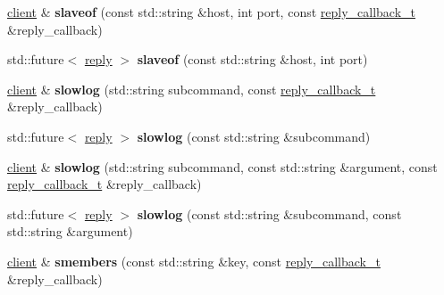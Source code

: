 \begin{DoxyCompactItemize}
\mbox{\hyperlink{classcpp__redis_1_1client}{client}} \& {\bfseries slaveof} (const std\+::string \&host, int port, const \mbox{\hyperlink{classcpp__redis_1_1client_af7a65eb21aa25230bfbb0b0203c4fc04}{reply\+\_\+callback\+\_\+t}} \&reply\+\_\+callback)
\item 
\mbox{\label{classcpp__redis_1_1client_a1731c94f72a209ffcba25767b8cab386}} 
std\+::future$<$ \mbox{\hyperlink{classcpp__redis_1_1reply}{reply}} $>$ {\bfseries slaveof} (const std\+::string \&host, int port)
\item 
\mbox{\label{classcpp__redis_1_1client_a76a67c81c82d7acb761119a9652e2e6e}} 
\mbox{\hyperlink{classcpp__redis_1_1client}{client}} \& {\bfseries slowlog} (std\+::string subcommand, const \mbox{\hyperlink{classcpp__redis_1_1client_af7a65eb21aa25230bfbb0b0203c4fc04}{reply\+\_\+callback\+\_\+t}} \&reply\+\_\+callback)
\item 
\mbox{\label{classcpp__redis_1_1client_a73f52f578ac8f266eb6e2b1f2a9cfdff}} 
std\+::future$<$ \mbox{\hyperlink{classcpp__redis_1_1reply}{reply}} $>$ {\bfseries slowlog} (const std\+::string \&subcommand)
\item 
\mbox{\label{classcpp__redis_1_1client_ab798e699b50114c4832f285fe95b6955}} 
\mbox{\hyperlink{classcpp__redis_1_1client}{client}} \& {\bfseries slowlog} (std\+::string subcommand, const std\+::string \&argument, const \mbox{\hyperlink{classcpp__redis_1_1client_af7a65eb21aa25230bfbb0b0203c4fc04}{reply\+\_\+callback\+\_\+t}} \&reply\+\_\+callback)
\item 
\mbox{\label{classcpp__redis_1_1client_a4b3b0c8b11cc1e7f0bdb827eba6f7dc3}} 
std\+::future$<$ \mbox{\hyperlink{classcpp__redis_1_1reply}{reply}} $>$ {\bfseries slowlog} (const std\+::string \&subcommand, const std\+::string \&argument)
\item 
\mbox{\label{classcpp__redis_1_1client_a83458f3cff3680410d34f263cd9f30bc}} 
\mbox{\hyperlink{classcpp__redis_1_1client}{client}} \& {\bfseries smembers} (const std\+::string \&key, const \mbox{\hyperlink{classcpp__redis_1_1client_af7a65eb21aa25230bfbb0b0203c4fc04}{reply\+\_\+callback\+\_\+t}} \&reply\+\_\+callback)
\item 

\end{DoxyCompactItemize}
